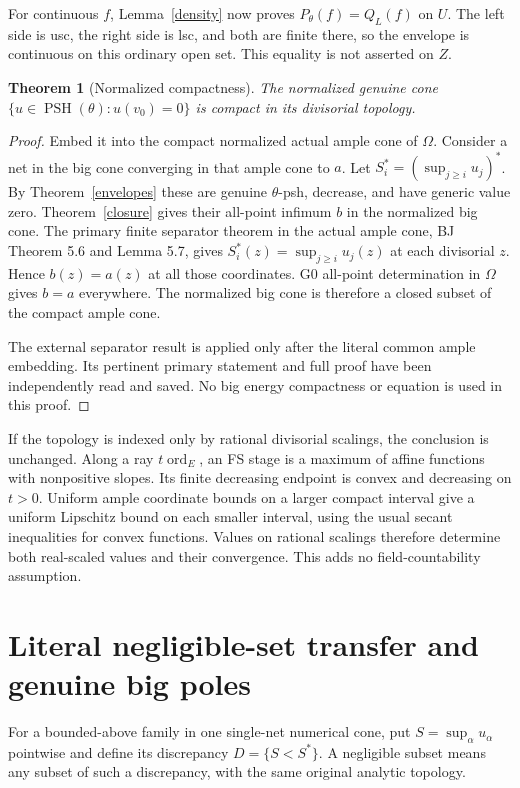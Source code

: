 \documentclass[10pt]{article}
\newtheorem{theorem}{Theorem}[section]
\newcommand{\PSH}{\operatorname{PSH}}
\begin{document}
For continuous $f$, Lemma~\ref{density} now proves
$P_\theta(f)=Q_L(f)$ on $U$. The left side is usc, the right side
is lsc, and both are finite there, so the envelope is continuous on
this ordinary open set. This equality is not asserted on $Z$.

\begin{theorem}[Normalized compactness]\label{compact}
The normalized genuine cone $\{u\in\PSH(\theta):u(v_0)=0\}$ is compact
in its divisorial topology.
\end{theorem}
\begin{proof}
Embed it into the compact normalized actual ample cone of $\Omega$.
Consider a net in the big cone converging in that ample cone to $a$.
Let $S_i^*=(\sup_{j\geq i}u_j)^*$. By Theorem~\ref{envelopes} these
are genuine $\theta$-psh, decrease, and have generic value zero.
Theorem~\ref{closure} gives their all-point infimum $b$ in the
normalized big cone. The primary finite separator theorem in the
actual ample cone, BJ Theorem 5.6 and Lemma 5.7, gives
$S_i^*(z)=\sup_{j\geq i}u_j(z)$ at each divisorial $z$. Hence
$b(z)=a(z)$ at all those coordinates. G0 all-point determination
in $\Omega$ gives $b=a$ everywhere. The normalized big cone is
therefore a closed subset of the compact ample cone.

The external separator result is applied only after the literal
common ample embedding. Its pertinent primary statement and full
proof have been independently read and saved. No big energy compactness
or equation is used in this proof.
\end{proof}

If the topology is indexed only by rational divisorial scalings, the
conclusion is unchanged. Along a ray $t\operatorname{ord}_E$, an FS
stage is a maximum of affine functions with nonpositive slopes. Its
finite decreasing endpoint is convex and decreasing on $t>0$.
Uniform ample coordinate bounds on a larger compact interval give
a uniform Lipschitz bound on each smaller interval, using the usual
secant inequalities for convex functions. Values on rational scalings
therefore determine both real-scaled values and their convergence.
This adds no field-countability assumption.

\section{Literal negligible-set transfer and genuine big poles}
For a bounded-above family in one single-net numerical cone, put
$S=\sup_\alpha u_\alpha$ pointwise and define its discrepancy
$D=\{S<S^*\}$. A negligible subset means any subset of such a
discrepancy, with the same original analytic topology.
\end{document}
